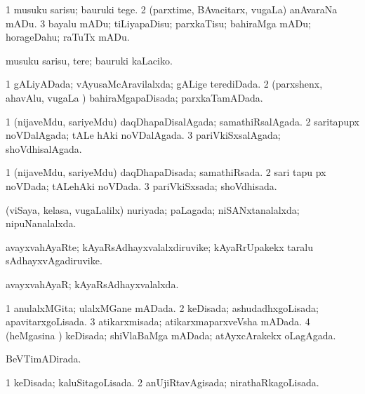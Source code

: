 \bentry
{} 
\gl{\sakirx}
\expl{}
\bmng
\bnum
\num{1} musuku sarisu; bauruki tege. 
\num{2} (parxtime, BAvacitarx, \mo vugaLa) anAvaraNa mADu. 
\num{3} bayalu mADu; tiLiyapaDisu; parxkaTisu; bahiraMga mADu; horageDahu; raTuTx mADu. 
\enum
\emng

\noindent
\gl{\akirx}
\expl{}
\bmng
musuku sarisu, tere; bauruki kaLaciko. 
\emng
\eentry

\bentry
{} 
\gl{\gu}
\expl{}
\bmng
\bnum
\num{1} gALiyADada; vAyusaMcAravilalxda; gALige terediDada. 
\num{2} (parxshenx, ahavAlu, \mo vugaLa \vi) bahiraMgapaDisada; parxkaTamADada. 
\enum
\emng
\eentry

\bentry
{} 
\gl{\gu}
\expl{}
\bmng
\bnum
\num{1} (nijaveMdu, sariyeMdu) daqDhapaDisalAgada; samathiRsalAgada. 
\num{2} saritapupx noVDalAgada; tALe hAki noVDalAgada. 
\num{3} pariVkiSxsalAgada; shoVdhisalAgada. 
\enum
\emng
\eentry

\bentry
{} 
\gl{\gu}
\expl{}
\bmng
\bnum
\num{1} (nijaveMdu, sariyeMdu) daqDhapaDisada; samathiRsada. 
\num{2} sari tapu px noVDada; tALehAki noVDada. 
\num{3} pariVkiSxsada; shoVdhisada. 
\enum
\emng
\eentry

\bentry
{} 
\gl{\gu}
\expl{}
\bmng
(viSaya, kelasa, \mo vugaLalilx) nuriyada; paLagada; niSANxtanalalxda; nipuNanalalxda. 
\emng
\eentry

\bentry
{} 
\gl{\nA}
\expl{}
\bmng
avayxvahAyaRte; kAyaRsAdhayxvalalxdiruvike; kAyaRrUpakekx taralu sAdhayxvAgadiruvike. 
\emng
\eentry

\bentry
{} 
\gl{\gu}
\expl{}
\bmng
avayxvahAyaR; kAyaRsAdhayxvalalxda. 
\emng
\eentry

\bentry
{} 
\gl{\gu}
\expl{}
\bmng
\bnum
\num{1} anulalxMGita; ulalxMGane mADada. 
\num{2} keDisada; ashudadhxgoLisada; apavitarxgoLisada. 
\num{3} atikarxmisada; atikarxmaparxveVsha mADada. 
\num{4} (heMgasina \vi) keDisada; shiVlaBaMga mADada; atAyxcArakekx oLagAgada. 
\enum
\emng
\eentry

\bentry
{} 
\gl{\gu}
\expl{}
\bmng
BeVTimADirada. 
\emng
\eentry

\bentry
{} 
\gl{\gu}
\expl{}
\bmng
\bnum
\num{1} keDisada; kaluSitagoLisada. 
\num{2} anUjiRtavAgisada; nirathaRkagoLisada. 
\enum
\emng
\eentry

